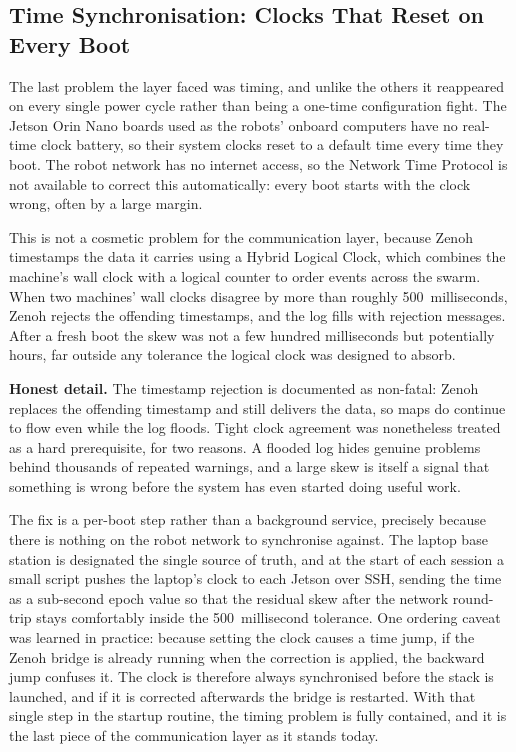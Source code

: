 \subsection{Time Synchronisation: Clocks That Reset on Every Boot}
\label{subsec:time_sync}

The last problem the layer faced was timing, and unlike the others it reappeared on every single power cycle rather than being a one-time configuration fight. The Jetson Orin Nano boards used as the robots' onboard computers have no real-time clock battery, so their system clocks reset to a default time every time they boot. The robot network has no internet access, so the Network Time Protocol is not available to correct this automatically: every boot starts with the clock wrong, often by a large margin.

This is not a cosmetic problem for the communication layer, because Zenoh timestamps the data it carries using a Hybrid Logical Clock, which combines the machine's wall clock with a logical counter to order events across the swarm. When two machines' wall clocks disagree by more than roughly 500~milliseconds, Zenoh rejects the offending timestamps, and the log fills with rejection messages. After a fresh boot the skew was not a few hundred milliseconds but potentially hours, far outside any tolerance the logical clock was designed to absorb.

\begin{notebox}
\textbf{Honest detail.} The timestamp rejection is documented as non-fatal: Zenoh replaces the offending timestamp and still delivers the data, so maps do continue to flow even while the log floods. Tight clock agreement was nonetheless treated as a hard prerequisite, for two reasons. A flooded log hides genuine problems behind thousands of repeated warnings, and a large skew is itself a signal that something is wrong before the system has even started doing useful work.
\end{notebox}

The fix is a per-boot step rather than a background service, precisely because there is nothing on the robot network to synchronise against. The laptop base station is designated the single source of truth, and at the start of each session a small script pushes the laptop's clock to each Jetson over SSH, sending the time as a sub-second epoch value so that the residual skew after the network round-trip stays comfortably inside the 500~millisecond tolerance. One ordering caveat was learned in practice: because setting the clock causes a time jump, if the Zenoh bridge is already running when the correction is applied, the backward jump confuses it. The clock is therefore always synchronised before the stack is launched, and if it is corrected afterwards the bridge is restarted. With that single step in the startup routine, the timing problem is fully contained, and it is the last piece of the communication layer as it stands today.


